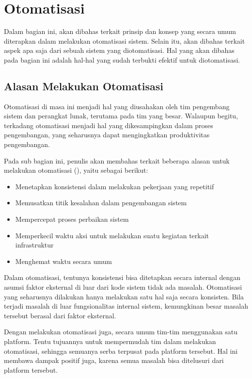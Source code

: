\section{Otomatisasi}\label{automation}

Dalam bagian ini, akan dibahas terkait prinsip dan konsep yang secara umum diterapkan dalam melakukan otomatisasi sistem. Selain itu, akan dibahas terkait aspek apa saja dari sebuah sistem yang diotomatisasi. Hal yang akan dibahas pada bagian ini adalah hal-hal yang sudah terbukti efektif untuk diotomatisasi.

\subsection{Alasan Melakukan Otomatisasi}
Otomatisasi di masa ini menjadi hal yang diusahakan oleh tim pengembang sistem dan perangkat lunak, terutama pada tim yang besar. Walaupun begitu, terkadang otomatisasi menjadi hal yang dikesampingkan dalam proses pengembangan, yang seharusnya dapat mengingkatkan produktivitas pengembangan.

Pada sub bagian ini, penulis akan membahas terkait beberapa alasan untuk melakukan otomatisasi (\cite{beyer2016site}), yaitu sebagai berikut:

\begin{itemize}
  \item Menetapkan konsistensi dalam melakukan pekerjaan yang repetitif
  \item Memusatkan titik kesalahan dalam pengembangan sistem
  \item Mempercepat proses perbaikan sistem
  \item Memperkecil waktu aksi untuk melakukan suatu kegiatan terkait infrastruktur
  \item Menghemat waktu secara umum
\end{itemize}

Dalam otomatisasi, tentunya konsistensi bisa ditetapkan secara internal dengan asumsi faktor eksternal di luar dari kode sistem tidak ada masalah. Otomatisasi yang seharusnya dilakukan hanya melakukan satu hal saja secara konsisten. Bila terjadi masalah di luar fungsionalitas internal sistem, kemungkinan besar masalah tersebut berasal dari faktor eksternal.

Dengan melakukan otomatisasi juga, secara umum tim-tim menggunakan satu platform. Tentu tujuannya untuk mempermudah tim dalam melakukan otomatisasi, sehingga semuanya serba terpusat pada platform tersebut. Hal ini membawa dampak positif juga, karena semua masalah bisa ditelusuri dari platform tersebut.

